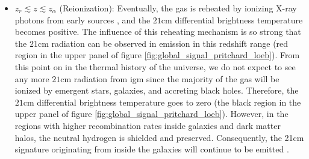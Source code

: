 \documentclass[12pt, TexShade, letterpaper]{report}
\begin{document}
\begin{itemize}
\item $z_r \lesssim z \lesssim z_\alpha$ (Reionization): Eventually, the gas is reheated by ionizing X-ray photons from early sources \cite{21century}, and the $\mathrm{21cm}$ differential brightness temperature becomes positive. The influence of this reheating mechanism is so strong that the $\mathrm{21cm}$ radiation can be observed in emission in this redshift range (red region in the upper panel of figure \ref{fig:global_signal_pritchard_loeb}). From this point on in the thermal history of the universe, we do not expect to see any more $\mathrm{21cm}$ radiation from \gls{igm} since the majority of the gas will be ionized by emergent stars, galaxies, and accreting black holes. Therefore, the $\mathrm{21cm}$ differential brightness temperature goes to zero (the black region in the upper panel of figure \ref{fig:global_signal_pritchard_loeb}). However, in the regions with higher recombination rates inside galaxies and dark matter halos, the neutral hydrogen is shielded and preserved. Consequently, the 21cm signature originating from inside the galaxies will continue to be emitted \cite{map_universe, 21century}.\par
\end{itemize}
\end{document}
